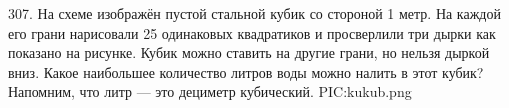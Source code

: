 307. На схеме изображён пустой стальной кубик со стороной 1 метр. На каждой его грани нарисовали 25 одинаковых квадратиков и просверлили три дырки как показано на рисунке. Кубик можно ставить на другие грани, но нельзя дыркой вниз. Какое наибольшее количество литров воды можно налить в этот кубик? Напомним, что литр --- это дециметр кубический.
{{PIC:kukub.png}}\\
